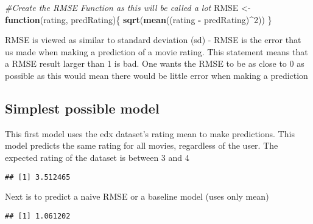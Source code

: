 \documentclass[
]{article}
\newenvironment{Shaded}{\begin{snugshade}}{\end{snugshade}}
\newcommand{\CommentTok}[1]{\textcolor[rgb]{0.56,0.35,0.01}{\textit{#1}}}
\newcommand{\ControlFlowTok}[1]{\textcolor[rgb]{0.13,0.29,0.53}{\textbf{#1}}}
\newcommand{\DecValTok}[1]{\textcolor[rgb]{0.00,0.00,0.81}{#1}}
\newcommand{\KeywordTok}[1]{\textcolor[rgb]{0.13,0.29,0.53}{\textbf{#1}}}
\newcommand{\NormalTok}[1]{#1}
\newcommand{\OperatorTok}[1]{\textcolor[rgb]{0.81,0.36,0.00}{\textbf{#1}}}
\newcommand{\StringTok}[1]{\textcolor[rgb]{0.31,0.60,0.02}{#1}}
\begin{document}
\begin{Shaded}
\begin{Highlighting}[]
\CommentTok{#Create the RMSE Function as this will be called a lot}
\NormalTok{RMSE <-}\StringTok{ }\ControlFlowTok{function}\NormalTok{(rating, predRating)\{}
  \KeywordTok{sqrt}\NormalTok{(}\KeywordTok{mean}\NormalTok{((rating }\OperatorTok{-}\StringTok{ }\NormalTok{predRating)}\OperatorTok{^}\DecValTok{2}\NormalTok{))}
\NormalTok{\}}
\end{Highlighting}
\end{Shaded}

RMSE is viewed as similar to standard deviation (sd) - RMSE is the error
that us made when making a prediction of a movie rating. This statement
means that a RMSE result larger than 1 is bad. One wants the RMSE to be
as close to 0 as possible as this would mean there would be little error
when making a prediction

\hypertarget{simplest-possible-model}{%
\subsection{Simplest possible model}\label{simplest-possible-model}}

This first model uses the edx dataset's rating mean to make predictions.
This model predicts the same rating for all movies, regardless of the
user. The expected rating of the dataset is between 3 and 4

\begin{Shaded}
\end{Shaded}

\begin{verbatim}
## [1] 3.512465
\end{verbatim}

Next is to predict a naive RMSE or a baseline model (uses only mean)

\begin{Shaded}
\end{Shaded}

\begin{verbatim}
## [1] 1.061202
\end{verbatim}
\end{document}
